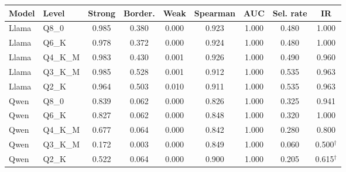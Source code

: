 \begin{tabular}{llccccccc}
\toprule
Model & Level & Strong & Border. & Weak & Spearman & AUC & Sel. rate & IR \\
\midrule
Llama & Q8\_0 & 0.985 & 0.380 & 0.000 & 0.923 & 1.000 & 0.480 & 1.000 \\
Llama & Q6\_K & 0.978 & 0.372 & 0.000 & 0.924 & 1.000 & 0.480 & 1.000 \\
Llama & Q4\_K\_M & 0.983 & 0.430 & 0.001 & 0.926 & 1.000 & 0.490 & 0.960 \\
Llama & Q3\_K\_M & 0.985 & 0.528 & 0.001 & 0.912 & 1.000 & 0.535 & 0.963 \\
Llama & Q2\_K & 0.964 & 0.503 & 0.010 & 0.911 & 1.000 & 0.535 & 0.963 \\
Qwen & Q8\_0 & 0.839 & 0.062 & 0.000 & 0.826 & 1.000 & 0.325 & 0.941 \\
Qwen & Q6\_K & 0.827 & 0.062 & 0.000 & 0.848 & 1.000 & 0.320 & 1.000 \\
Qwen & Q4\_K\_M & 0.677 & 0.064 & 0.000 & 0.842 & 1.000 & 0.280 & 0.800 \\
Qwen & Q3\_K\_M & 0.172 & 0.003 & 0.000 & 0.849 & 1.000 & 0.060 & 0.500$^{\dagger}$ \\
Qwen & Q2\_K & 0.522 & 0.064 & 0.000 & 0.900 & 1.000 & 0.205 & 0.615$^{\dagger}$ \\
\bottomrule
\end{tabular}
